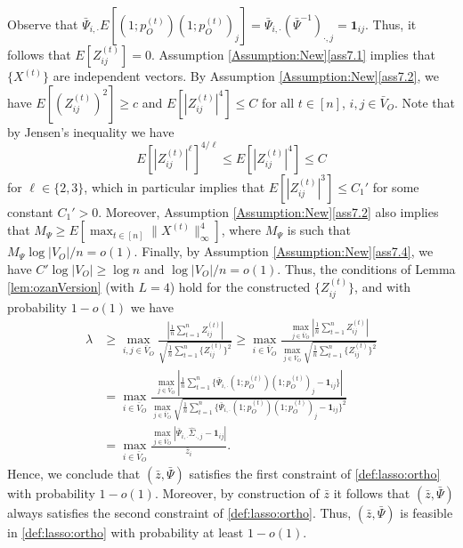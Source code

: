 \documentclass[opre,nonblindrev]{informs3} %
\def\Pii{\bar{\Psi}_{i,\cdot} }
\begin{document}
\begin{APPENDIX}{}
Observe that
$
\Pii E[ (1;p_O^{(t)})(1;p_O^{(t)})_j] =  \Pii  (\bar \Psi^{-1})_{\cdot,j} = \mathbf{1}_{ij} $.
Thus, it follows that $E[Z^{(t)}_{ij}]=0$.
Assumption \ref{Assumption:New}\ref{ass7.1} implies that $\{X^{(t)}\}$ are independent vectors.
By Assumption \ref{Assumption:New}\ref{ass7.2}, we have
$E[ (Z^{(t)}_{ij})^2]\geq c$ and $E[ |Z^{(t)}_{ij}|^4]\leq C$
for all $t\in[n]$, $i,j\in \bar{V}_O$.
Note that  by Jensen's inequality we have
\begin{equation}\label{eq:JensenZij}
E[ |Z^{(t)}_{ij}|^\ell]^{4/\ell} \leq 
E[ |Z^{(t)}_{ij}|^4] \leq C
\end{equation}
for $\ell\in \{2,3\}$, which in particular implies that 
$E[ |Z^{(t)}_{ij}|^3] \leq C_1'$ for some constant $C_1'>0$.
Moreover, 
 Assumption \ref{Assumption:New}\ref{ass7.2} also
implies that
	${M}_\Psi \geq E[\max_{t\in[n] } \|X^{(t)}\|_\infty^4 ]$,
where
${M}_\Psi$
is such that
${M}_\Psi {\log |V_O|}/{n} = o(1)$.
Finally,
by Assumption \ref{Assumption:New}\ref{ass7.4}, we have
$ C' \log |V_O| \geq  \log n$ and ${\log |V_O|}/{n}=o(1)$.
Thus, the
conditions of   Lemma \ref{lem:ozanVersion} (with $L=4$)
hold for the constructed $\{Z^{(t)}_{ij} \}$, and
with probability $1-o(1)$ we have
\begin{equation} \label{eq:MDSN_bound3_o}
\begin{aligned}
\lambda  &\geq
\max_{i,j\in \bar{V}_O}
\frac{    \left|\frac{1}{n} \sum_{t=1}^n  Z^{(t)}_{ij}  \right| }{   \sqrt{\frac{1}{n}
		\sum_{t=1}^n \{Z^{(t)}_{ij} \}^2}} \geq 
\max_{i\in \bar{V}_O}
\frac{  \max_{j\in \bar{V}_O} \left|\frac{1}{n} \sum_{t=1}^n  Z^{(t)}_{ij}  \right| }{  \max_{j\in \bar{V}_O} \sqrt{\frac{1}{n}
		\sum_{t=1}^n \{Z^{(t)}_{ij} \}^2}}\\
&=
 \max_{i\in \bar{V}_O} \frac{ \max_{j\in\bar{V}_O} \left| \frac{1}{n} \sum_{t=1}^n \{
 	\Pii (1;p_O^{(t)})(1;p_O^{(t)})_j - \mathbf{1}_{ij}\}\right|}{  \max_{j\in\bar{V}_O} \sqrt{\frac{1}{n} \sum_{t=1}^n \{ \Pii (1;p_O^{(t)})(1;p_O^{(t)})_j- \mathbf{1}_{ij}\}^2}} \\
&=
 \max_{i\in{\bar V}_O}\frac{ \max_{j\in\bar{V}_O}  | \Pii \hat{\Sigma}_{\cdot,j} - \mathbf{1}_{ij} | }{\bar{z}_i }
.
\end{aligned}
\end{equation}
Hence, we conclude that
$(\bar{z},\bar \Psi)$ satisfies the
first constraint of \eqref{def:lasso:ortho} with probability $1-o(1)$.
Moreover,
by construction of $\bar{z}$ it follows that
$(\bar{z},\bar \Psi)$ always satisfies the second constraint of \eqref{def:lasso:ortho}.
Thus,
$(\bar{z},\bar \Psi)$ is feasible in \eqref{def:lasso:ortho} with probability at least $1-o(1)$.




\end{APPENDIX}
\end{document}
